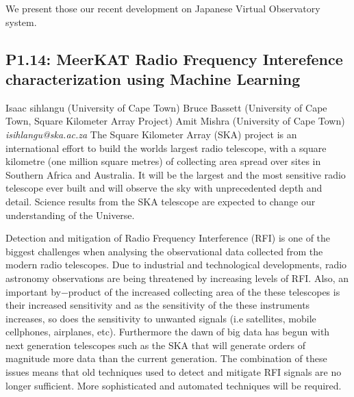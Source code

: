 \documentclass{report}
\begin{document}
We present those our recent development on Japanese Virtual Observatory system.\newline
\newpage
\subsection*{P1.14: MeerKAT Radio Frequency Interefence characterization using Machine Learning}
\bigskip
Isaac sihlangu (University of Cape Town) \newline Bruce Bassett (University of Cape Town, Square Kilometer Array Project) \newline  Amit Mishra (University of Cape Town)\newline   \newline  \newline  \newline\newline
{\it isihlangu@ska.ac.za}\newline
\newline\newline
The Square Kilometer Array (SKA) project is an international effort to build the worlds largest radio telescope, with a square kilometre (one million square metres) of collecting area spread over sites in Southern Africa and Australia. It will be the largest and the most sensitive radio telescope ever built and will observe the sky with unprecedented depth and detail. Science results from the SKA telescope are expected to change our understanding of the Universe.

Detection and mitigation of Radio Frequency Interference (RFI) is one of the biggest challenges when analysing the observational data collected from the modern radio telescopes. Due to industrial and technological developments, radio astronomy observations are being
threatened by increasing levels of RFI. Also, an important by−product of the increased collecting area of the these telescopes is their increased sensitivity and as the sensitivity of the these instruments increases, so does the sensitivity to unwanted signals (i.e satellites, mobile cellphones, airplanes, etc). Furthermore the dawn of big data has begun with next generation telescopes such as the SKA that will generate orders of magnitude more data than the current generation. The combination of these issues means that old techniques used to detect and mitigate RFI signals are no longer sufficient. More sophisticated and automated techniques will be required.
\end{document}
